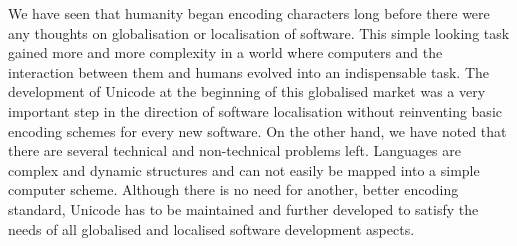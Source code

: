 \documentclass[a4paper, 12pt]{scrartcl} %
\begin{document}
We have seen that humanity began encoding characters long before there were
any thoughts on globalisation or localisation of software. This simple looking
task gained more and more complexity in a world where computers and the
interaction between them and humans evolved into an indispensable task. The
development of Unicode at the beginning of this globalised market was a very
important step in the direction of software localisation without reinventing
basic encoding schemes for every new software. On the other hand, we have
noted that there are several technical and non-technical problems left.
Languages are complex and dynamic structures and can not easily be mapped into
a simple computer scheme. Although there is no need for another, better
encoding standard, Unicode has to be maintained and further developed to
satisfy the needs of all globalised and localised software development aspects.

\newpage
\printglossary[style=long3col]
\listoftables

\begingroup
\raggedright

\endgroup
\end{document}

